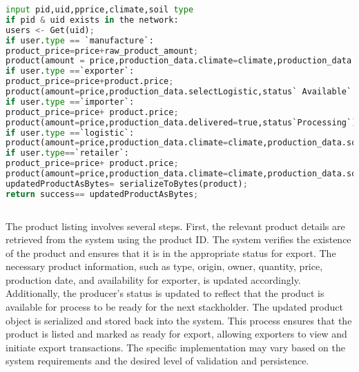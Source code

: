 \begin{lstlisting}[language=Python , caption=product listing]
input pid,uid,pprice,climate,soil type
if pid & uid exists in the network:
users <- Get(uid);
if user.type == `manufacture`:
product_price=price+raw_product_amount;
product(amount = price,production_data.climate=climate,production_data.soil_type=soil_type,status`Available`,product.availableFor=`exporter`)
if user.type ==`exporter`:
product_price=price+product.price;
product(amount=price,production_data.selectLogistic,status` Available` ,product.availableFor=`importer`)
if user.type ==`importer`:
product_price=price+ product.price;
product(amount=price,production_data.delivered=true,status`Processing`)
if user.type ==`logistic`:
product(amount=price,production_data.climate=climate,production_data.soil_type=soil_type,status`Available` ,product.availableFor=`retailer`)
if user.type==`retailer`:
product_price=price+ product.price;
product(amount=price,production_data.climate=climate,production_data.soil_type=soil_type,status`Available` ,product.availableFor=`consumer`)
updatedProductAsBytes= serializeToBytes(product);
return success== updatedProductAsBytes;
      
\end{lstlisting}
The product listing involves several steps. First, the relevant product details are retrieved from the system using the product ID. The system verifies the existence of the product and ensures that it is in the appropriate status for export. The necessary product information, such as type, origin, owner, quantity, price, production date, and availability for exporter, is updated accordingly. Additionally, the producer's status is updated to reflect that the product is available for process to be ready for the next stackholder. The updated product object is serialized and stored back into the system. This process ensures that the product is listed and marked as ready for export, allowing exporters to view and initiate export transactions. The specific implementation may vary based on the system requirements and the desired level of validation and persistence.